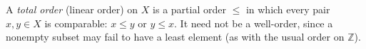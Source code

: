 
A \emph{total order} (linear order) on $X$ is a partial order $\le$ in which every pair $x,y\in X$ is comparable: $x\le y$ or $y\le x$. It need not be a well-order, since a nonempty subset may fail to have a least element (as with the usual order on $\mathbb Z$).
